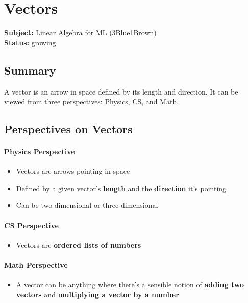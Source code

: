 \section{Vectors}
\label{sec:vectors}

\noindent\textbf{Subject:} Linear Algebra for ML (3Blue1Brown) \\
\textbf{Status:} growing

\subsection*{Summary}
A vector is an arrow in space defined by its length and direction. It can be viewed from three perspectives: Physics, CS, and Math.

\subsection{Perspectives on Vectors}

\paragraph{Physics Perspective}
\begin{itemize}[nosep]
  \item Vectors are arrows pointing in space
  \item Defined by a given vector's \textbf{length} and the \textbf{direction} it's pointing
  \item Can be two-dimensional or three-dimensional
\end{itemize}

\paragraph{CS Perspective}
\begin{itemize}[nosep]
  \item Vectors are \textbf{ordered lists of numbers}
\end{itemize}

\paragraph{Math Perspective}
\begin{itemize}[nosep]
  \item A vector can be anything where there's a sensible notion of \textbf{adding two vectors} and \textbf{multiplying a vector by a number}
\end{itemize}

